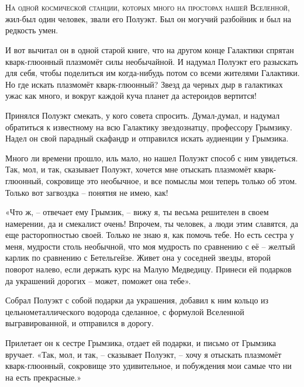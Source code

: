 \documentclass[ebook,oneside,final,openright]{memoir}
\begin{document}
\chapter{}
 \lettrine{Н}{а одной космической станции, которых много на просторах нашей Вселенной,} жил-был один человек, звали его Полуэкт. Был он могучий разбойник и был на редкость умен.\par
\par
И вот вычитал он в одной старой книге, что на другом конце Галактики спрятан кварк-глюонный плазмомёт силы необычайной. И надумал Полуэкт его разыскать для себя, чтобы поделиться им когда-нибудь потом со всеми жителями Галактики. Но где искать плазмомёт кварк-глюонный? Звезд да черных дыр в галактиках ужас как много, и вокруг каждой куча планет да астероидов вертится!\par
\par
Принялся Полуэкт смекать, у кого совета спросить. Думал-думал, и надумал обратиться к известному на всю Галактику звездознатцу, профессору Грымзику. Надел он свой парадный скафандр и отправился искать аудиенции у Грымзика.\par
\par
Много ли времени прошло, иль мало, но нашел Полуэкт способ с ним увидеться. Так, мол, и так, сказывает Полуэкт, хочется мне отыскать плазмомёт кварк-глюонный, сокровище это необычное, и все помыслы мои теперь только об этом. Только вот загвоздка – понятия не имею, как!\par
\par
«Что ж, – отвечает ему Грымзик, – вижу я, ты весьма решителен в своем намерении, да и смекалист очень! Впрочем, ты человек, а люди этим славятся, да еще расторопностью своей. Только не знаю я, как помочь тебе. Но есть сестра у меня, мудрости столь необычной, что моя мудрость по сравнению с её – желтый карлик по сравнению с Бетельгейзе. Живет она у соседней звезды, второй поворот налево, если держать курс на Малую Медведицу. Принеси ей подарков да украшений дорогих – может, поможет она тебе».\par
\par
Собрал Полуэкт с собой подарки да украшения, добавил к ним кольцо из цельнометаллического водорода сделанное, с формулой Вселенной выгравированной, и отправился в дорогу.\par
\par
Прилетает он к сестре Грымзика, отдает ей подарки, и письмо от Грымзика вручает. «Так, мол, и так, – сказывает Полуэкт, – хочу я отыскать плазмомёт кварк-глюонный, сокровище это удивительное, и побуждения мои самые что ни на есть прекрасные.»\par
\end{document}
